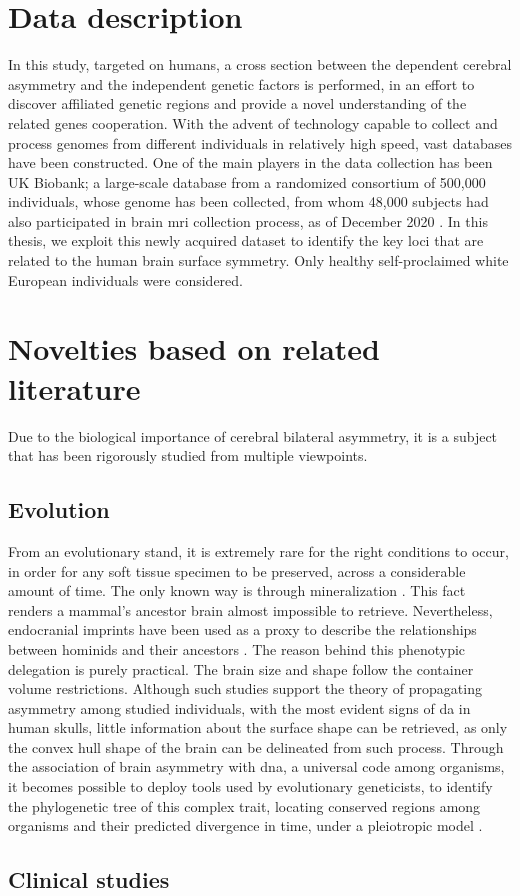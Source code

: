 \section{Data description}
In this study, targeted on humans, a cross section between the dependent cerebral asymmetry and the independent genetic factors is performed, in an effort to discover affiliated genetic regions and provide a novel understanding of the related genes cooperation. With the advent of technology capable to collect and process genomes from different individuals in relatively high speed, vast databases have been constructed. One of the main players in the data collection has been UK Biobank; a large-scale database from a randomized consortium of 500,000 individuals, whose genome has been collected, from whom  48,000 subjects had also participated in brain \ac{mri} collection process, as of December 2020 \cite{Littlejohns2020}. In this thesis, we exploit this newly acquired dataset to identify the key loci that are related to the human brain surface symmetry. Only healthy self-proclaimed white European individuals were considered. 

\section{Novelties based on related literature} 
 Due to the biological importance of cerebral bilateral asymmetry, it is a subject that has been rigorously studied from multiple viewpoints.
 \subsection{Evolution}
 From an evolutionary stand, it is extremely rare for the right conditions to occur, in order for any soft tissue specimen to be preserved, across a considerable amount of time. The only known way is through mineralization \cite{Purnell2018}. This fact renders a mammal's ancestor brain almost impossible to retrieve. Nevertheless, endocranial imprints have been used as a proxy to describe the relationships between hominids and their ancestors \cite{Balzeau2012}\cite{Neubauer2020}. The reason behind this phenotypic delegation is purely practical. The brain size and shape follow the container volume restrictions. Although such studies support the theory of propagating asymmetry among studied individuals, with the most evident signs of \ac{da} in human skulls, little information about the surface shape can be retrieved, as only the convex hull shape of the brain can be delineated from such process. Through the association of brain asymmetry with \acs{dna}, a universal code among organisms, it becomes possible to deploy tools used by evolutionary geneticists, to identify the phylogenetic tree of this complex trait, locating conserved regions among organisms and their predicted divergence in time, under a pleiotropic model \cite{Koch2021}.
 \subsection{Clinical studies}
 